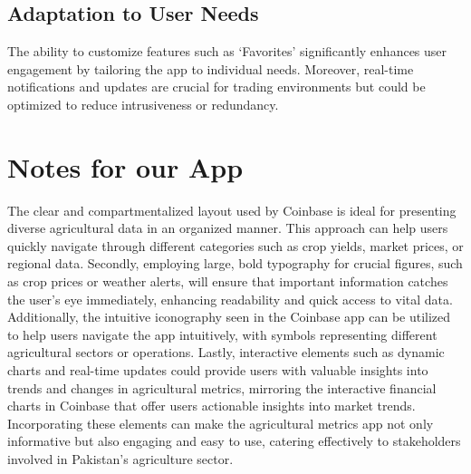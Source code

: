 \documentclass[12pt]{article}
\begin{document}
\subsection{Adaptation to User Needs}
The ability to customize features such as `Favorites' significantly enhances user engagement by tailoring the app to individual needs. Moreover, real-time notifications and updates are crucial for trading environments but could be optimized to reduce intrusiveness or redundancy.

\section{Notes for our App}
The clear and compartmentalized layout used by Coinbase is ideal for presenting diverse agricultural data in an organized manner. This approach can help users quickly navigate through different categories such as crop yields, market prices, or regional data. Secondly, employing large, bold typography for crucial figures, such as crop prices or weather alerts, will ensure that important information catches the user’s eye immediately, enhancing readability and quick access to vital data. Additionally, the intuitive iconography seen in the Coinbase app can be utilized to help users navigate the app intuitively, with symbols representing different agricultural sectors or operations. Lastly, interactive elements such as dynamic charts and real-time updates could provide users with valuable insights into trends and changes in agricultural metrics, mirroring the interactive financial charts in Coinbase that offer users actionable insights into market trends. Incorporating these elements can make the agricultural metrics app not only informative but also engaging and easy to use, catering effectively to stakeholders involved in Pakistan's agriculture sector.
\end{document}
